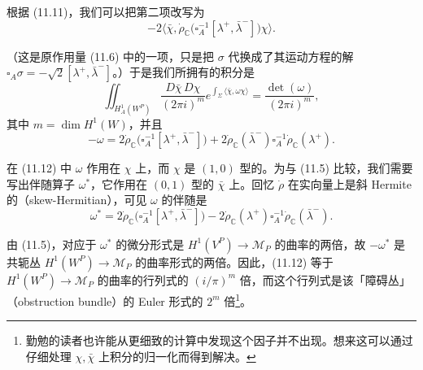 根据 (11.11)，我们可以把第二项改写为
\[
  -2\bigl\langle\bar\chi,\dot\rho_{\mathbb{C}}\bigl(\square_A^{-1}[\lambda^+,\bar\lambda^-]\bigr)\chi\bigr\rangle.
\]

（这是原作用量 (11.6) 中的一项，只是把 $\sigma$ 代换成了其运动方程的解 $\square_A\sigma=-\sqrt2[\lambda^+,\bar\lambda^-]$。）于是我们所拥有的积分是
\begin{equation}
  \tag{11.12}
  \label{eq:sol11-12}
  \iint_{H^1_A(W^P)}\frac{D\bar\chi\,D\chi}{(2\pi i)^m}
  e^{\int_\Sigma\langle\bar\chi,\omega\chi\rangle}
  =\frac{\det(\omega)}{(2\pi i)^m},
\end{equation}
其中 $m=\dim H^1(W)$，并且
\[
  -\omega=2\dot\rho_{\mathbb{C}}\bigl(\square_A^{-1}[\lambda^+,\bar\lambda^-]\bigr)
  +2\dot\rho_{\mathbb{C}}(\bar\lambda^-)\square_A^{-1}\dot\rho_{\mathbb{C}}(\lambda^+).
\]

在 (11.12) 中 $\omega$ 作用在 $\chi$ 上，而 $\chi$ 是 $(1,0)$ 型的。为与 (11.5) 比较，我们需要写出伴随算子 $\omega^*$，它作用在 $(0,1)$ 型的 $\bar\chi$ 上。回忆 $\dot\rho$ 在实向量上是斜 Hermite 的（skew-Hermitian），可见 $\omega$ 的伴随是
\[
  \omega^*=2\dot\rho_{\mathbb{C}}\bigl(\square_A^{-1}[\lambda^+,\bar\lambda^-]\bigr)
  -2\dot\rho_{\mathbb{C}}(\lambda^+)\square_A^{-1}\dot\rho_{\mathbb{C}}(\bar\lambda^-).
\]

由 (11.5)，对应于 $\omega^*$ 的微分形式是 $H^1(V^P)\to\mathcal{M}_P$ 的曲率的两倍，故 $-\omega^*$ 是共轭丛 $H^1(W^P)\to\mathcal{M}_P$ 的曲率形式的两倍。因此，(11.12) 等于 $H^1(W^P)\to\mathcal{M}_P$ 的曲率的行列式的 $(i/\pi)^m$ 倍，而这个行列式是该「障碍丛」（obstruction bundle）的 Euler 形式的 $2^m$ 倍\footnote{%
勤勉的读者也许能从更细致的计算中发现这个因子并不出现。想来这可以通过仔细处理 $\chi,\bar\chi$ 上积分的归一化而得到解决。}。

